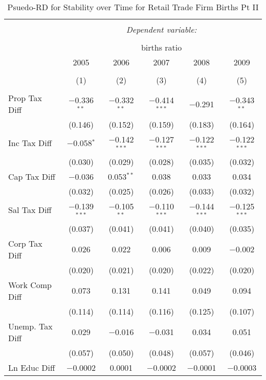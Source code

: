 
\begin{table}[!htbp] \centering 
  \caption{Psuedo-RD for Stability over Time for  Retail Trade Firm Births Pt II} 
  \label{44-45year} 
\small 
\begin{tabular}{@{\extracolsep{5pt}}lccccc} 
\\[-1.8ex]\hline 
\hline \\[-1.8ex] 
 & \multicolumn{5}{c}{\textit{Dependent variable:}} \\ 
\cline{2-6} 
\\[-1.8ex] & \multicolumn{5}{c}{births ratio} \\ 
 & 2005 & 2006 & 2007 & 2008 & 2009 \\ 
\\[-1.8ex] & (1) & (2) & (3) & (4) & (5)\\ 
\hline \\[-1.8ex] 
 Prop Tax Diff & $-$0.336$^{**}$ & $-$0.332$^{**}$ & $-$0.414$^{***}$ & $-$0.291 & $-$0.343$^{**}$ \\ 
  & (0.146) & (0.152) & (0.159) & (0.183) & (0.164) \\ 
  Inc Tax Diff & $-$0.058$^{*}$ & $-$0.142$^{***}$ & $-$0.127$^{***}$ & $-$0.122$^{***}$ & $-$0.122$^{***}$ \\ 
  & (0.030) & (0.029) & (0.028) & (0.035) & (0.032) \\ 
  Cap Tax Diff & $-$0.036 & 0.053$^{**}$ & 0.038 & 0.033 & 0.034 \\ 
  & (0.032) & (0.025) & (0.026) & (0.033) & (0.032) \\ 
  Sal Tax Diff & $-$0.139$^{***}$ & $-$0.105$^{**}$ & $-$0.110$^{***}$ & $-$0.144$^{***}$ & $-$0.125$^{***}$ \\ 
  & (0.037) & (0.041) & (0.041) & (0.040) & (0.035) \\ 
  Corp Tax Diff & 0.026 & 0.022 & 0.006 & 0.009 & $-$0.002 \\ 
  & (0.020) & (0.021) & (0.020) & (0.022) & (0.020) \\ 
  Work Comp Diff & 0.073 & 0.131 & 0.141 & 0.049 & 0.094 \\ 
  & (0.114) & (0.114) & (0.116) & (0.125) & (0.107) \\ 
  Unemp. Tax Diff & 0.029 & $-$0.016 & $-$0.031 & 0.034 & 0.051 \\ 
  & (0.057) & (0.050) & (0.048) & (0.057) & (0.046) \\ 
  Ln Educ Diff & $-$0.0002 & 0.0001 & $-$0.0002 & $-$0.0001 & $-$0.0003 \\ 

\end{tabular}
\end{table}
